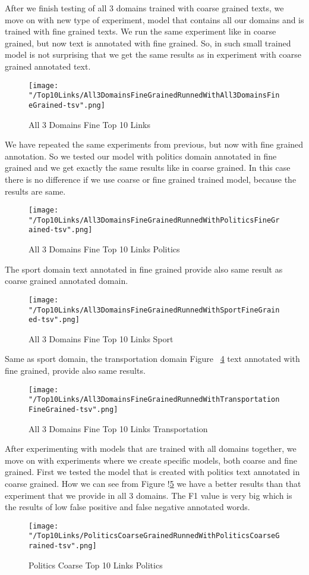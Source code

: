 \documentclass[thesis=M,english]{FITthesis}[2018/05/30]
\begin{document}
	
	After we finish testing of all 3 domains trained with coarse grained texts, we move on with new type of experiment, model that contains all our domains and is trained with fine grained texts. We run the same experiment like in coarse grained, but now text is annotated with fine grained. So, in such small trained model is not surprising that we get the same results as in experiment with coarse grained annotated text.
	\begin{figure}[H]\centering
		\texttt{[image: "/Top10Links/All3DomainsFineGrainedRunnedWithAll3DomainsFineGrained-tsv".png]}
		\caption{All 3 Domains Fine Top 10 Links }\label{}	
	\end{figure}
	
	We have repeated the same experiments from previous, but now with fine grained annotation. So we tested our model with politics domain annotated in fine grained and we get exactly the same results like in coarse grained. In this case there is no difference if we use coarse or fine grained trained model, because the results are same.
	\begin{figure}[H]\centering
		\texttt{[image: "/Top10Links/All3DomainsFineGrainedRunnedWithPoliticsFineGrained-tsv".png]}
		\caption{All 3 Domains Fine Top 10 Links Politics}\label{}
	\end{figure}	

	The sport domain text annotated in fine grained provide also same result as coarse grained annotated domain. 
	\begin{figure}[H]\centering
		\texttt{[image: "/Top10Links/All3DomainsFineGrainedRunnedWithSportFineGrained-tsv".png]}
		\caption{All 3 Domains Fine Top 10 Links Sport}\label{}
	\end{figure}
	
	Same as sport domain, the transportation domain Figure ~\ref{img:all3DomainWithTransportationFineTop10} text annotated with fine grained, provide also same results.
	\begin{figure}[H]\centering
		\texttt{[image: "/Top10Links/All3DomainsFineGrainedRunnedWithTransportationFineGrained-tsv".png]}
		\caption{All 3 Domains Fine Top 10 Links Transportation}\label{img:all3DomainWithTransportationFineTop10}	
	\end{figure}
	
	After experimenting with models that are trained with all domains together, we move on with experiments where we create specific models, both coarse and fine grained.
	First we tested the model that is created with politics text annotated in coarse grained. How we can see from Figure !\ref{img:PoliticsWithPoliticsCoarseTop10} we have a better results than that experiment that we provide in all 3 domains. The F1 value is very big which is the results of low false positive and false negative annotated words.        
	\begin{figure}[H]\centering
		\texttt{[image: "/Top10Links/PoliticsCoarseGrainedRunnedWithPoliticsCoarseGrained-tsv".png]}
		\caption{Politics Coarse Top 10 Links Politics}\label{img:PoliticsWithPoliticsCoarseTop10}
	\end{figure}	
\end{document}
